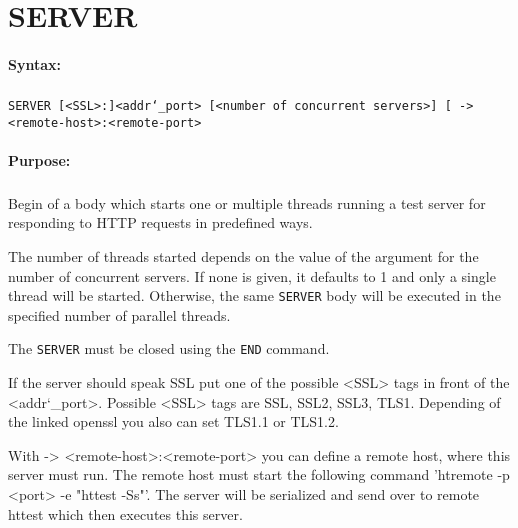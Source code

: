 
\newpage
\section{SERVER}
\label{cmd:SERVER}

\paragraph{Syntax:}
\subparagraph{}
\texttt{SERVER [<SSL>:]<addr\char`\_port> [<number of concurrent servers>] [ -> <remote-host>:<remote-port> }

\paragraph{Purpose:}
\subparagraph{}
Begin of a body which starts one or multiple threads running a test server for responding  
to HTTP requests in predefined ways.

The number of threads started depends on the value of the argument for 
the number of concurrent servers. If none is given, it defaults to 1 and 
only a single thread will be started. Otherwise, the same \texttt{SERVER} body will 
be executed in the specified number of parallel threads.

The \texttt{SERVER} must be closed using the \texttt{END} command.

If the server should speak SSL put one of the possible <SSL> tags in front of the <addr\char`\_port>. Possible <SSL> tags are SSL, SSL2, SSL3, TLS1. Depending of the linked openssl you also can set TLS1.1 or TLS1.2.

With -> <remote-host>:<remote-port> you can define a remote host, where this server must run. The remote host must start the following command 'htremote -p <port> -e "httest -Ss"'. The server will be serialized and send over to remote httest which then executes this server.

